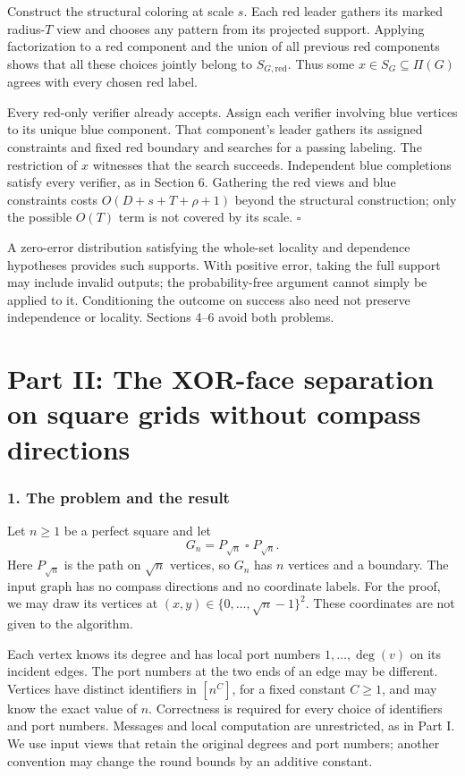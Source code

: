 \documentclass[11pt,a4paper]{article}
\begin{document}
Construct the structural coloring at scale \(s\).
Each red leader gathers its marked radius-\(T\) view and chooses any pattern from its projected support.
Applying factorization to a red component and the union of all previous red components shows that all these choices jointly belong to \(S_{G,\text{red}}\).
Thus some \(x\in S_G\subseteq\Pi(G)\) agrees with every chosen red label.

Every red-only verifier already accepts.
Assign each verifier involving blue vertices to its unique blue component.
That component's leader gathers its assigned constraints and fixed red boundary and searches for a passing labeling.
The restriction of \(x\) witnesses that the search succeeds.
Independent blue completions satisfy every verifier, as in Section 6.
Gathering the red views and blue constraints costs \(O(D+s+T+\rho+1)\) beyond the structural construction; only the possible \(O(T)\) term is not covered by its scale. \(\square\)

A zero-error distribution satisfying the whole-set locality and dependence hypotheses provides such supports.
With positive error, taking the full support may include invalid outputs; the probability-free argument cannot simply be applied to it.
Conditioning the outcome on success also need not preserve independence or locality.
Sections 4--6 avoid both problems.
\clearpage
\part{Part II: The XOR-face separation on square grids without compass directions}
\section{1. The problem and the result}\label{grid-problem-and-result}

Let \(n\ge1\) be a perfect square and let
\[ G_n=P_{\sqrt n}\mathbin{\square}P_{\sqrt n}. \]
Here \(P_{\sqrt n}\) is the path on \(\sqrt n\) vertices, so \(G_n\) has \(n\) vertices and a boundary.
The input graph has no compass directions and no coordinate labels.
For the proof, we may draw its vertices at \((x,y)\in\{0,\ldots,\sqrt n-1\}^2\).
These coordinates are not given to the algorithm.

Each vertex knows its degree and has local port numbers \(1,\ldots,\deg(v)\) on its incident edges.
The port numbers at the two ends of an edge may be different.
Vertices have distinct identifiers in \([n^C]\), for a fixed constant \(C\ge1\), and may know the exact value of \(n\).
Correctness is required for every choice of identifiers and port numbers.
Messages and local computation are unrestricted, as in Part I.
We use input views that retain the original degrees and port numbers; another convention may change the round bounds by an additive constant.
\end{document}
